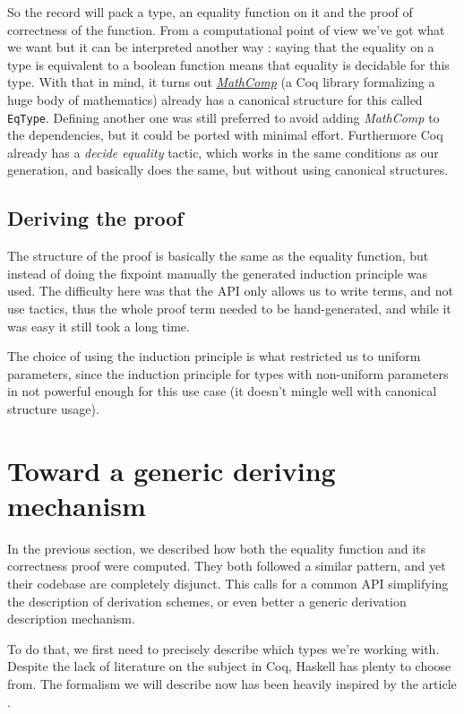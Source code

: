 \documentclass{article}
\begin{document}
So the record will pack a type, an equality function on it and the proof of
correctness of the function. From a computational point of view we've got what we
want but it can be interpreted another way : saying that the equality on a
type is equivalent to a boolean function means that equality is decidable for
this type. With that in mind, it turns out
\href{https://github.com/math-comp/math-comp}{\emph{MathComp}} (a Coq library
formalizing a huge body of mathematics) already has a
canonical structure for this called \texttt{EqType}. Defining another one was
still preferred to avoid adding \emph{MathComp} to the dependencies, but it
could be ported with minimal effort. Furthermore Coq already has a
\emph{decide equality} tactic, which works in the same conditions as our
generation, and basically does the same, but without using canonical structures.

\subsection{Deriving the proof}

The structure of the proof is basically the same as the equality function, but
instead of doing the fixpoint manually the generated induction principle was
used. The difficulty here was that the API only allows us to write terms, and
not use tactics, thus the whole proof term needed to be hand-generated, and
while it was easy it still took a long time.

The choice of using the induction principle is what restricted us to uniform
parameters, since the induction principle for types with non-uniform parameters
in not powerful enough for this use case (it doesn't mingle well with canonical
structure usage).

\section{Toward a generic deriving mechanism}\label{gender}

In the previous section, we described how both the equality function and its
correctness proof were computed. They both followed a similar pattern, and
yet their codebase are completely disjunct. This calls for a common API
simplifying the description of derivation schemes, or even better a generic
derivation description mechanism.

To do that, we first need to precisely describe which types we're working with.
Despite the lack of literature on the subject in Coq, Haskell has plenty to
choose from. The formalism we will describe now has been heavily inspired by
the article \cite{genDep}.
\end{document}
